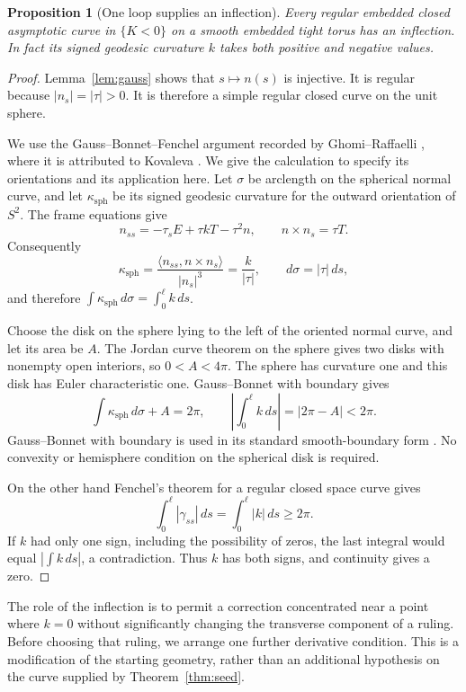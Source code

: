 \documentclass[11pt]{amsart}
\newtheorem{proposition}[theorem]{Proposition}
\theoremstyle{definition}
\begin{document}
\begin{proposition}[One loop supplies an inflection]\label{prop:inflection}
Every regular embedded closed asymptotic curve in $\{K<0\}$ on
a smooth embedded tight torus has an inflection. In fact its
signed geodesic curvature $k$ takes both positive and negative values.
\end{proposition}
\begin{proof}
Lemma~\ref{lem:gauss} shows that $s\mapsto n(s)$ is injective.
It is regular because $|n_s|=|\tau|>0$. It is therefore a simple
regular closed curve on the unit sphere.

We use the Gauss--Bonnet--Fenchel argument recorded by
Ghomi--Raffaelli \cite[Note~5.2, equations~(10)--(12)]{GR}, where
it is attributed to Kovaleva \cite{Kovaleva}. We give the calculation
to specify its orientations and its application here.
Let $\sigma$ be arclength on the spherical normal curve, and
let $\kappa_{\mathrm{sph}}$ be its signed geodesic curvature
for the outward orientation of $S^2$.
The frame equations give
\[
 n_{ss}=-\tau_sE+\tau kT-\tau^2n,\qquad
 n\times n_s=\tau T.
\]
Consequently
\[
 \kappa_{\mathrm{sph}}
 =\frac{\langle n_{ss},n\times n_s\rangle}{|n_s|^3}
 =\frac{k}{|\tau|},\qquad d\sigma=|\tau|\,ds,
\]
and therefore $\int\kappa_{\mathrm{sph}}\,d\sigma=\int_0^\ell k\,ds$.

Choose the disk on the sphere lying to the left of the oriented
normal curve, and let its area be $A$. The Jordan curve theorem
on the sphere gives two disks with nonempty open interiors, so
$0<A<4\pi$. The sphere has curvature one and this disk has Euler
characteristic one. Gauss--Bonnet with boundary gives
\[
 \int\kappa_{\mathrm{sph}}\,d\sigma+A=2\pi,
 \qquad
 \left|\int_0^\ell k\,ds\right|=|2\pi-A|<2\pi .
\]
Gauss--Bonnet with boundary is used in its standard smooth-boundary
form \cite[\S4-5]{doCarmo}. No convexity or hemisphere condition
on the spherical disk is required.

On the other hand Fenchel's theorem \cite{Fenchel} for a regular
closed space curve gives
\[
 \int_0^\ell|\gamma_{ss}|\,ds
 =\int_0^\ell|k|\,ds\ge2\pi.
\]
If $k$ had only one sign, including the possibility of zeros,
the last integral would equal $|\int k\,ds|$, a contradiction.
Thus $k$ has both signs, and continuity gives a zero.
\end{proof}

The role of the inflection is to permit a correction concentrated
near a point where $k=0$ without significantly changing the
transverse component of a ruling. Before choosing that ruling,
we arrange one further derivative condition. This is a modification
of the starting geometry, rather than an additional hypothesis on
the curve supplied by Theorem~\ref{thm:seed}.
\end{document}
